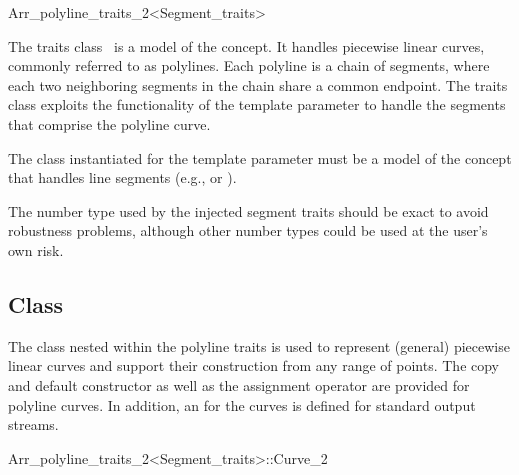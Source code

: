 \ccRefPageBegin
\begin{ccRefClass}{Arr_polyline_traits_2<Segment_traits>}

\ccDefinition

  The traits class \ccRefName\ is a model of the 
  concept. It handles piecewise linear curves, commonly referred to as
  polylines. Each polyline is a chain of segments, where each two neighboring
  segments in the chain share a common endpoint. The traits class exploits the
  functionality of the  template parameter to handle the
  segments that comprise the polyline curve.

  The class instantiated for the template parameter  must
  be a model of the  concept that handles line
  segments (e.g.,  or 
  ).

  The number type used by the injected segment traits should be exact to avoid
  robustness problems, although other number types could be used at the user's
  own risk.


\ccIsModel
   

\subsection*{Class }

The  class nested within the polyline traits is used to
represent (general) piecewise linear curves and support their construction
from any range of points. The copy and default constructor as well as 
the assignment operator are provided for polyline curves. In addition, 
an  for the curves is defined for standard output streams.

\begin{ccClass}{Arr_polyline_traits_2<Segment_traits>::Curve_2}

\ccTypes



\end{ccClass}
\end{ccRefClass}
